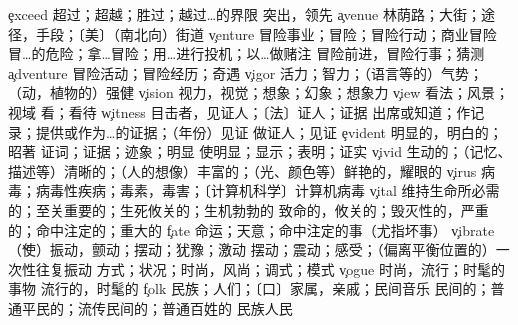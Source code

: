 \begin{multicols}{2}
\c{exceed}  \vt 超过；超越；胜过；越过…的界限 \vi 突出，领先
\c{avenue}  \n 林荫路；大街；途径，手段；〔美〕（南北向）街道
\c{venture}  \n 冒险事业；冒险；冒险行动；商业冒险 \vt 冒…的危险；拿…冒险；用…进行投机；以…做赌注 \vi 冒险前进，冒险行事；猜测 
\c{adventure}  \n 冒险活动；冒险经历；奇遇
\c{vigor}  \n 活力；智力；（语言等的）气势；（动，植物的）强健
\c{vision}  \n 视力，视觉；想象；幻象；想象力
\c{view}  \n 看法；风景；视域 \vt 看；看待
\c{witness}  \n 目击者，见证人；〔法〕证人；证据 \vt 出席或知道；作记录；提供或作为…的证据；（年份）见证 \vi 做证人；见证
\c{evident}  \a 明显的，明白的；昭著
  \n 证词；证据；迹象；明显 \vt 使明显；显示；表明；证实
\c{vivid}  \a 生动的；（记忆、描述等）清晰的；（人的想像）丰富的；（光、颜色等）鲜艳的，耀眼的
\c{virus}  \n 病毒；病毒性疾病；毒素，毒害；〔计算机科学〕计算机病毒
\c{vital}  \a 维持生命所必需的；至关重要的；生死攸关的；生机勃勃的
  \a 致命的，攸关的；毁灭性的，严重的；命中注定的；重大的
\c{fate}  \n 命运；天意；命中注定的事（尤指坏事）
\c{vibrate}  \v （使）振动，颤动；摆动；犹豫；激动
  \n 摆动；震动；感受；（偏离平衡位置的）一次性往复振动
  \n 方式；状况；时尚，风尚；调式；模式
\c{vogue}  \n 时尚，流行；时髦的事物 \a 流行的，时髦的
\c{folk}  \n 民族；人们；〔口〕家属，亲戚；民间音乐 \a 民间的；普通平民的；流传民间的；普通百姓的 
  \n 民族人民


\end{multicols}
